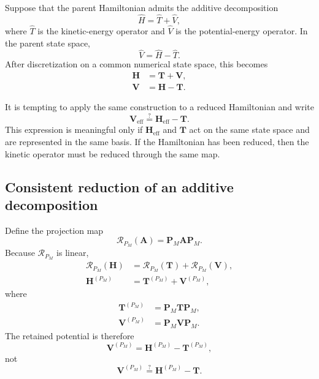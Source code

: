 Suppose that the parent Hamiltonian admits the additive decomposition
\begin{equation}
    \hat H=\hat T+\hat V,
\end{equation}
where $\hat T$ is the kinetic-energy operator and $\hat V$ is the
potential-energy operator. In the parent state space,
\begin{equation}
    \hat V=\hat H-\hat T.
\end{equation}
After discretization on a common numerical state space, this becomes
\begin{align}
    \mathbf H
    &=
    \mathbf T+\mathbf V,
    \\
    \mathbf V
    &=
    \mathbf H-\mathbf T.
\end{align}

It is tempting to apply the same construction to a reduced Hamiltonian and
write
\begin{equation}
    \mathbf V_{\mathrm{eff}}
    \stackrel{?}{=}
    \mathbf H_{\mathrm{eff}}-\mathbf T.
\end{equation}
This expression is meaningful only if $\mathbf H_{\mathrm{eff}}$ and
$\mathbf T$ act on the same state space and are represented in the same
basis. If the Hamiltonian has been reduced, then the kinetic operator must be
reduced through the same map.

\subsection{Consistent reduction of an additive decomposition}

Define the projection map
\begin{equation}
    \mathcal R_{P_M}(\mathbf A)
    =
    \mathbf P_M\mathbf A\mathbf P_M.
\end{equation}
Because $\mathcal R_{P_M}$ is linear,
\begin{align}
    \mathcal R_{P_M}(\mathbf H)
    &=
    \mathcal R_{P_M}(\mathbf T)
    +
    \mathcal R_{P_M}(\mathbf V),
    \\
    \mathbf H^{(P_M)}
    &=
    \mathbf T^{(P_M)}
    +
    \mathbf V^{(P_M)},
\end{align}
where
\begin{align}
    \mathbf T^{(P_M)}
    &=
    \mathbf P_M\mathbf T\mathbf P_M,
    \\
    \mathbf V^{(P_M)}
    &=
    \mathbf P_M\mathbf V\mathbf P_M.
\end{align}
The retained potential is therefore
\begin{equation}
    \mathbf V^{(P_M)}
    =
    \mathbf H^{(P_M)}
    -
    \mathbf T^{(P_M)},
\end{equation}
not
\begin{equation}
    \mathbf V^{(P_M)}
    \stackrel{?}{=}
    \mathbf H^{(P_M)}-\mathbf T.
\end{equation}

